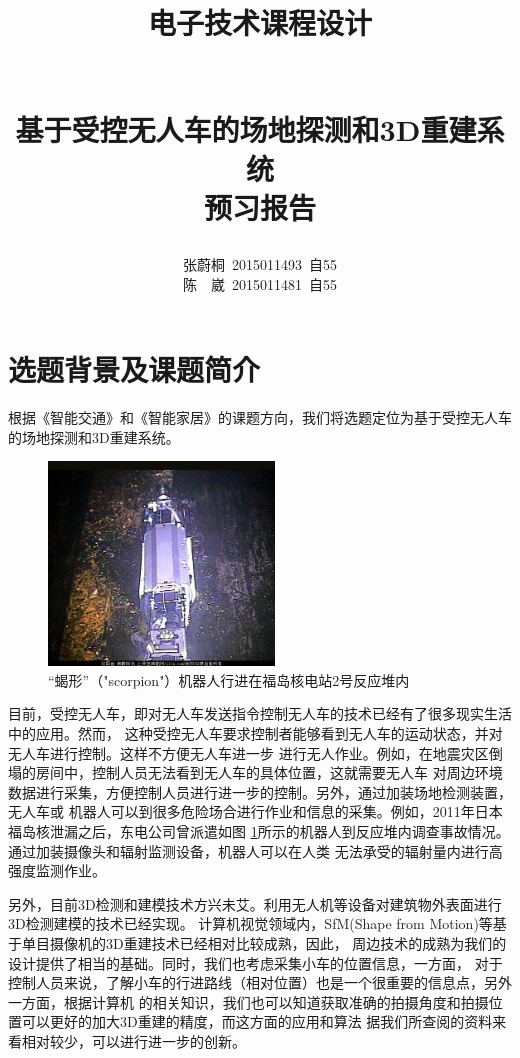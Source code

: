 \documentclass[a4paper]{paper}
\title{
    \begin{large}电子技术课程设计\end{large}\\
    基于受控无人车的场地探测和3D重建系统\\
    预习报告
}
\author{
    张蔚桐\ 2015011493\ 自55\\
    陈　崴\ 2015011481\ 自55
}
\begin{document}
\newcommand{\tabincell}[2]{\begin{tabular}{@{}#1@{}}#2\end{tabular}}
\maketitle
\tableofcontents    
\clearpage
\section{选题背景及课题简介}
根据《智能交通》和《智能家居》的课题方向，我们将选题定位为基于受控无人车的场地探测和3D重建系统。

\begin{figure}
    \centering
    \includegraphics[width = 60mm]{Robo.jpg}
    \caption{“蝎形”（"scorpion"）机器人行进在福岛核电站2号反应堆内}
    \label{Robo}
\end{figure}
目前，受控无人车，即对无人车发送指令控制无人车的技术已经有了很多现实生活中的应用。然而，
这种受控无人车要求控制者能够看到无人车的运动状态，并对无人车进行控制。这样不方便无人车进一步
进行无人作业。例如，在地震灾区倒塌的房间中，控制人员无法看到无人车的具体位置，这就需要无人车
对周边环境数据进行采集，方便控制人员进行进一步的控制。另外，通过加装场地检测装置，无人车或
机器人可以到很多危险场合进行作业和信息的采集。例如，2011年日本福岛核泄漏之后，东电公司曾派遣如图
\ref{Robo}所示的机器人到反应堆内调查事故情况。通过加装摄像头和辐射监测设备，机器人可以在人类
无法承受的辐射量内进行高强度监测作业。

另外，目前3D检测和建模技术方兴未艾。利用无人机等设备对建筑物外表面进行3D检测建模的技术已经实现。
计算机视觉领域内，SfM(Shape from Motion)等基于单目摄像机的3D重建技术已经相对比较成熟，因此，
周边技术的成熟为我们的设计提供了相当的基础。同时，我们也考虑采集小车的位置信息，一方面，
对于控制人员来说，了解小车的行进路线（相对位置）也是一个很重要的信息点，另外一方面，根据计算机
的相关知识，我们也可以知道获取准确的拍摄角度和拍摄位置可以更好的加大3D重建的精度，而这方面的应用和算法
据我们所查阅的资料来看相对较少，可以进行进一步的创新。
\end{document}
